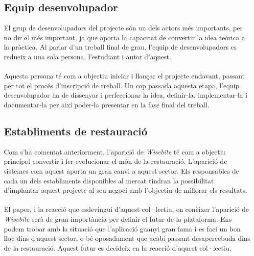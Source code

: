 \subsection{Equip desenvolupador}
El grup de desenvolupadors del projecte són un dels actors més importants, per no dir el més important, ja que aporta la capacitat de convertir la idea teòrica a la pràctica. Al parlar d'un treball final de grau, l'equip de desenvolupadors es redueix a una sola persona, l'estudiant i autor d'aquest.
\\\\
Aquesta persona té com a objectiu iniciar i llançar el projecte endavant, passant per tot el procés d'inscripció de treball. Un cop passada aquesta etapa, l'equip desenvolupador ha de dissenyar i perfeccionar la idea, definir-la, implementar-la i documentar-la per així poder-la presentar en la fase final del treball.

\subsection{Establiments de restauració}
Com s'ha comentat anteriorment, l'aparició de \textit{Wisebite} té com a objectiu principal convertir i fer evolucionar el món de la restauració. L'aparició de sistemes com aquest aporta un gran canvi a aquest sector. Els responsables de cada un dels establiments disponibles al mercat tindran la possibilitat d'implantar aquest projecte al seu negoci amb l'objectiu de millorar els resultats.
\\\\
El paper, i la reacció que esdevingui d'aquest col·lectiu, en conèixer l'aparició de \textit{Wisebite} serà de gran importància per definir el futur de la plataforma. Ens podem trobar amb la situació que l'aplicació guanyi gran fama i es faci un bon lloc dins d'aquest sector, o bé oposadament que acabi passant desapercebuda dins de la restauració. Aquest futur es decideix en la reacció d'aquest col·lectiu.

